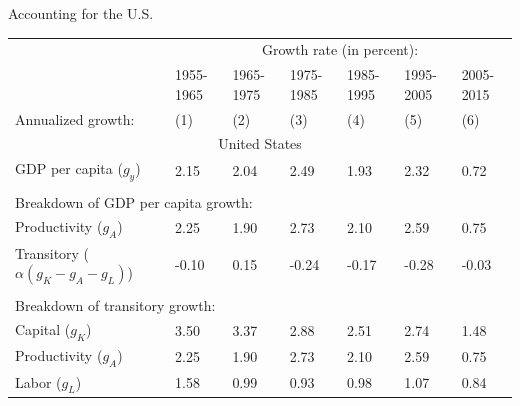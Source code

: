 \begin{frame}{Accounting for the U.S.}
\begin{scriptsize}
\begin{center}
\begin{tabularx}{\textwidth}{lXXXXXX}
\midrule
               & \multicolumn{6}{c}{Growth rate (in percent):} \\ \cmidrule(lr){2-7}
        & 1955-1965 & 1965-1975 & 1975-1985 & 1985-1995 & 1995-2005 & 2005-2015 \\
Annualized growth: & (1)       & (2)       & (3)       & (4)       & (5)       & (6)    \\
\midrule
%
\multicolumn{7}{c}{United States} \\
GDP per capita ($g_y$) & 2.15 & 2.04 & 2.49 & 1.93 & 2.32 & 0.72\\
\\
\multicolumn{7}{l}{Breakdown of GDP per capita growth:} \\
Productivity ($g_A$) & 2.25 & 1.90 & 2.73 & 2.10 & 2.59 & 0.75\\
Transitory ($\alpha (g_K - g_A - g_L)$) & -0.10 & 0.15 & -0.24 & -0.17 & -0.28 & -0.03\\
\\
\multicolumn{7}{l}{Breakdown of transitory growth:} \\
Capital ($g_K$) & 3.50 & 3.37 & 2.88 & 2.51 & 2.74 & 1.48\\
Productivity ($g_A$) & 2.25 & 1.90 & 2.73 & 2.10 & 2.59 & 0.75\\
Labor ($g_L$) & 1.58 & 0.99 & 0.93 & 0.98 & 1.07 & 0.84\\

\midrule
\end{tabularx}
\end{center}
\end{scriptsize}
\end{frame}

